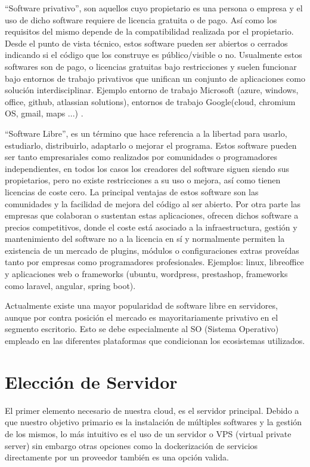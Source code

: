 “Software privativo”, son aquellos cuyo propietario es una persona o empresa y el uso de dicho software requiere de licencia gratuita o de pago. Así como los requisitos del mismo depende de la compatibilidad realizada por el propietario.
Desde el punto de vista técnico, estos software pueden ser abiertos o cerrados indicando si el código que los construye es público/visible o no. Usualmente estos softwares son de pago, o licencias gratuitas bajo restricciones y suelen funcionar bajo entornos de trabajo privativos que unifican un conjunto de aplicaciones como solución interdisciplinar. Ejemplo entorno de trabajo Microsoft (azure, windows, office, github, atlassian solutions), entornos de trabajo Google(cloud, chromium OS, gmail, maps ...) .

“Software Libre”, es un término que hace referencia a la libertad para usarlo, estudiarlo, distribuirlo, adaptarlo o mejorar el programa. Estos software pueden ser tanto empresariales como realizados por comunidades o programadores independientes, en todos los casos los creadores del software siguen siendo sus propietarios, pero no existe restricciones a su uso o mejora, así como tienen licencias de coste cero. La principal ventajas de estos software son las comunidades y la facilidad de mejora del código al ser abierto. Por otra parte las empresas que colaboran o sustentan estas aplicaciones, ofrecen dichos software a precios competitivos, donde el coste está asociado a la infraestructura, gestión y mantenimiento del software no a la licencia en sí y normalmente permiten la existencia de un mercado de plugins, módulos o configuraciones extras proveídas tanto por empresas como programadores profesionales. Ejemplos: linux, libreoffice y aplicaciones web o frameworks (ubuntu, wordpress, prestashop, frameworks como laravel, angular, spring boot).

Actualmente existe una mayor popularidad de software libre en servidores, aunque por contra posición el mercado es mayoritariamente privativo en el segmento escritorio. Esto se debe especialmente al SO (Sistema Operativo) empleado en las diferentes plataformas que condicionan los ecosistemas utilizados.

\section{Elección de Servidor}\label{S:anexo_segurizacion}
El primer elemento necesario de nuestra cloud, es el servidor principal. Debido a que nuestro objetivo primario es la instalación de múltiples softwares y la gestión de los mismos, lo más intuitivo es el uso de un servidor o VPS (virtual private server) sin embargo otras opciones como la dockerización de servicios directamente por un proveedor también es una opción valida.

